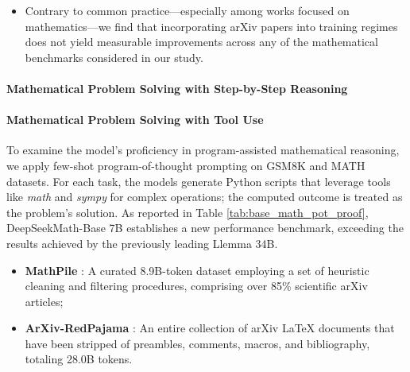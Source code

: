\begin{itemize}[topsep=0pt]
\begin{itemize}[topsep=0pt]
    \item \textbf{Code Training for 400B Tokens $\rightarrow$ Math Training for 150B Tokens}: We first pre-train DeepSeek-LLM 1.3B on 400B code tokens, followed by an additional 150B tokens consisting of mathematics content;
    \item \textbf{General Training for 400B Tokens $\rightarrow$ Math Training for 150B Tokens}: For comparison, we repeat the training protocol using 400B tokens sampled from a large-scale general corpus provided by DeepSeek-AI as the first-stage data instead of code, aiming to analyze the specific contributions of code data versus general data in strengthening mathematical reasoning.
\end{itemize}

    \item Contrary to common practice—especially among works focused on mathematics—we find that incorporating arXiv papers into training regimes does not yield measurable improvements across any of the mathematical benchmarks considered in our study.
\end{itemize}

\paragraph{Mathematical Problem Solving with Step-by-Step Reasoning}

\paragraph{Mathematical Problem Solving with Tool Use} To examine the model’s proficiency in program-assisted mathematical reasoning, we apply few-shot program-of-thought prompting \citep{pot,pal} on GSM8K and MATH datasets. For each task, the models generate Python scripts that leverage tools like \textit{math} and \textit{sympy} for complex operations; the computed outcome is treated as the problem’s solution. As reported in Table \ref{tab:base_math_pot_proof}, DeepSeekMath-Base 7B establishes a new performance benchmark, exceeding the results achieved by the previously leading Llemma 34B.

\begin{itemize}[topsep=0pt]
    \item \textbf{MathPile} \citep{mathpile}: A curated 8.9B-token dataset employing a set of heuristic cleaning and filtering procedures, comprising over 85\% scientific arXiv articles;
    \item \textbf{ArXiv-RedPajama} \citep{redpajama}: An entire collection of arXiv LaTeX documents that have been stripped of preambles, comments, macros, and bibliography, totaling 28.0B tokens.
\end{itemize}

